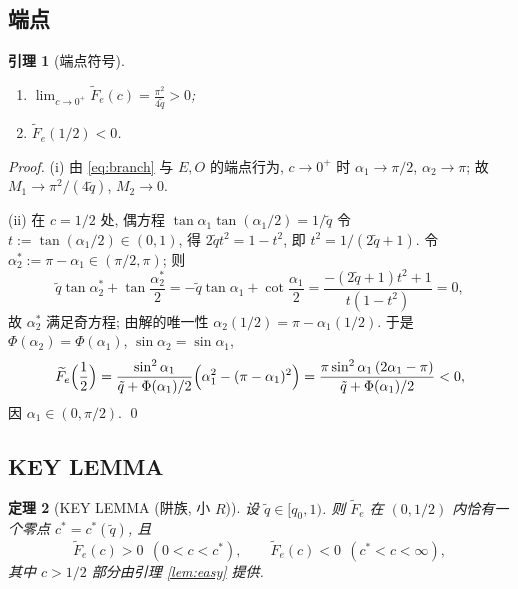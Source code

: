 \documentclass[UTF8]{ctexart}
\newtheorem{theorem}{定理}[section]
\newtheorem{lemma}[theorem]{引理}
\begin{document}
\subsection{端点}

\begin{lemma}[端点符号]\label{lem:endpoints}
\begin{enumerate}
	\item[(i)] $\displaystyle\lim_{c\to0^+}\widetilde F_e(c)=\frac{\pi^2}{4\tilde q}>0$;
	\item[(ii)] $\widetilde F_e(1/2)<0$.
\end{enumerate}
\end{lemma}

\begin{proof}
(i) 由 \eqref{eq:branch} 与 $E,O$ 的端点行为, $c\to0^+$ 时
$\alpha_1\to\pi/2$, $\alpha_2\to\pi$; 故 $M_1\to\pi^2/(4\tilde q)$,
$M_2\to0$.

(ii) 在 $c=1/2$ 处, 偶方程 $\tan\alpha_1\tan(\alpha_1/2)=1/\tilde q$ 令
$t:=\tan(\alpha_1/2)\in(0,1)$, 得 $2\tilde q t^2=1-t^2$, 即
$t^2=1/(2\tilde q+1)$. 令 $\alpha_2^*:=\pi-\alpha_1\in(\pi/2,\pi)$; 则
\begin{equation}
	\tilde q\tan\alpha_2^*+\tan\frac{\alpha_2^*}2
	=-\tilde q\tan\alpha_1+\cot\frac{\alpha_1}2
	=\frac{-(2\tilde q+1)t^2+1}{t(1-t^2)}=0,
\end{equation}
故 $\alpha_2^*$ 满足奇方程; 由解的唯一性 $\alpha_2(1/2)=\pi-\alpha_1(1/2)$.
于是 $\Phi(\alpha_2)=\Phi(\alpha_1)$, $\sin\alpha_2=\sin\alpha_1$,
\begin{equation}
	\widetilde F_e\Bigl(\frac12\Bigr)
	=\frac{\sin^2\alpha_1}{\tilde q+\Phi(\alpha_1)/2}
	\Bigl(\alpha_1^2-(\pi-\alpha_1)^2\Bigr)
	=\frac{\pi\sin^2\alpha_1\,(2\alpha_1-\pi)}{\tilde q+\Phi(\alpha_1)/2}<0,
	\label{eq:Fehalf}
\end{equation}
因 $\alpha_1\in(0,\pi/2)$. \qed
\end{proof}

\subsection{KEY LEMMA}

\begin{theorem}[KEY LEMMA (阱族, 小 $R$)]\label{thm:keylemma}
设 $\tilde q\in[q_0,1)$. 则 $\widetilde F_e$ 在 $(0,1/2)$ 内恰有一个零点
$c^*=c^*(\tilde q)$, 且
\begin{equation}
	\widetilde F_e(c)>0\ \ (0<c<c^*),\qquad
	\widetilde F_e(c)<0\ \ (c^*<c<\infty),
	\label{eq:FeSign}
\end{equation}
其中 $c>1/2$ 部分由引理 \ref{lem:easy} 提供.
\end{theorem}
\end{document}
